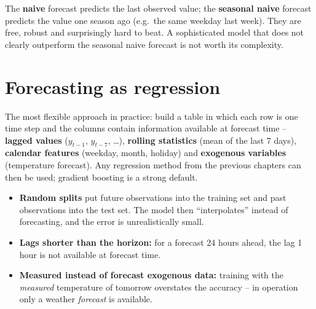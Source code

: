 \documentclass[
  letterpaper,
  DIV=11,
  numbers=noendperiod]{scrreprt}
\providecommand{\tightlist}{%
  \setlength{\itemsep}{0pt}\setlength{\parskip}{0pt}}\usepackage{longtable,booktabs,array}
\begin{document}
\begin{tcolorbox}[enhanced jigsaw, left=2mm, title=\textcolor{quarto-callout-tip-color}{\faLightbulb}\hspace{0.5em}{Engineering practice: always compare with naive forecasts}, opacityback=0, breakable, rightrule=.15mm, arc=.35mm, toptitle=1mm, colbacktitle=quarto-callout-tip-color!10!white, opacitybacktitle=0.6, coltitle=black, colframe=quarto-callout-tip-color-frame, bottomrule=.15mm, leftrule=.75mm, bottomtitle=1mm, titlerule=0mm, toprule=.15mm, colback=white]

The \textbf{naive} forecast predicts the last observed value; the
\textbf{seasonal naive} forecast predicts the value one season ago
(e.g.~the same weekday last week). They are free, robust and
surprisingly hard to beat. A sophisticated model that does not clearly
outperform the seasonal naive forecast is not worth its complexity.

\end{tcolorbox}

\section{Forecasting as regression}\label{forecasting-as-regression}

The most flexible approach in practice: build a table in which each row
is one time step and the columns contain information available at
forecast time -- \textbf{lagged values} (\(y_{t-1}\), \(y_{t-7}\),
\ldots), \textbf{rolling statistics} (mean of the last 7 days),
\textbf{calendar features} (weekday, month, holiday) and
\textbf{exogenous variables} (temperature forecast). Any regression
method from the previous chapters can then be used; gradient boosting is
a strong default.

\begin{tcolorbox}[enhanced jigsaw, left=2mm, title=\textcolor{quarto-callout-warning-color}{\faExclamationTriangle}\hspace{0.5em}{Pitfall: information from the future}, opacityback=0, breakable, rightrule=.15mm, arc=.35mm, toptitle=1mm, colbacktitle=quarto-callout-warning-color!10!white, opacitybacktitle=0.6, coltitle=black, colframe=quarto-callout-warning-color-frame, bottomrule=.15mm, leftrule=.75mm, bottomtitle=1mm, titlerule=0mm, toprule=.15mm, colback=white]

\begin{itemize}
\tightlist
\item
  \textbf{Random splits} put future observations into the training set
  and past observations into the test set. The model then
  ``interpolates'' instead of forecasting, and the error is
  unrealistically small.
\item
  \textbf{Lags shorter than the horizon:} for a forecast 24 hours ahead,
  the lag 1 hour is not available at forecast time.
\item
  \textbf{Measured instead of forecast exogenous data:} training with
  the \emph{measured} temperature of tomorrow overstates the accuracy --
  in operation only a weather \emph{forecast} is available.
\end{itemize}

\end{tcolorbox}
\end{document}

